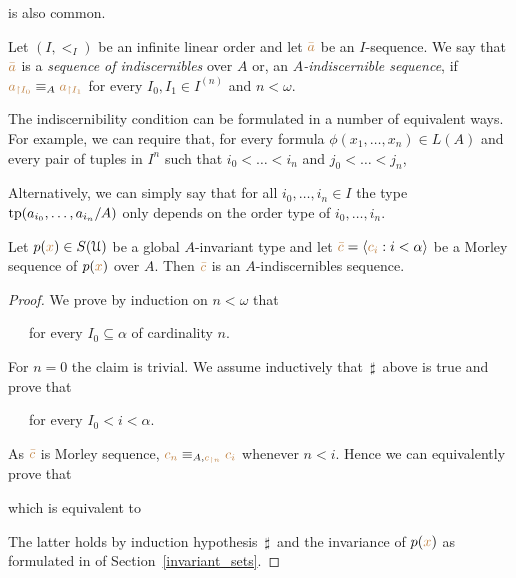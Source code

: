 
is also common.
\begin{definition}
Let $(I,<_I)$ be an infinite linear order and let ${\color{brown}\bar a}$ be an $I$-sequence.
We say that ${\color{brown}\bar a}$ is a \emph{sequence of indiscernibles\/} over $A$ or, an \emph{$A$-indiscernible sequence\/}, if ${\color{brown} a_{\restriction I_0}}\equiv_A {\color{brown} a_{\restriction I_1}}$ for every $I_0,I_1\in I^{(n)}$ and $n<\omega$.

\end{definition}

The indiscernibility condition can be formulated in a number of equivalent ways.
For example, we can require that, for every formula $\phi(x_1,\dots,x_n)\in L(A)$ and every pair of tuples in $I^n$ such that $i_0<\dots<i_n$ and $j_0<\dots<j_n$,



Alternatively, we can simply say that for all $i_0,\dots,i_n\in I$ the type ${\rm tp}(a_{i_0},\dots,a_{i_n}/A)$ only depends on the order type of $i_0,\dots,i_n$.

\begin{proposition}
Let $p({\color{brown} x})\in S(\EuScript U)$ be a global $A$-invariant type and let ${\color{brown}\bar c}=\langle{\color{brown}c_i}:i<\alpha\rangle$ be a Morley sequence of $p({\color{brown} x})$ over $A$.
Then ${\color{brown}\bar c}$ is an $A$-indiscernibles sequence.
\end{proposition}

\begin{proof}


We prove by induction on $n<\omega$ that

\ \ \ for every $I_0\subseteq\alpha$ of cardinality $n$.

For $n=0$ the claim is trivial.
We assume inductively that $\,\sharp\,$ above is true and prove that

\ \ \ for every $I_0<i<\alpha$.

As ${\color{brown}\bar c}$ is  Morley sequence, ${\color{brown} c_n}\equiv_{A,{\color{brown} c_{\restriction n}}} {\color{brown} c_i}$ whenever $n<i$.
Hence we can equivalently prove that


which is equivalent to


The latter holds by induction hypothesis $\,\sharp\,$ and the invariance of $p({\color{brown} x})$ as formulated in  of Section~\ref{invariant_sets}.
\end{proof}

